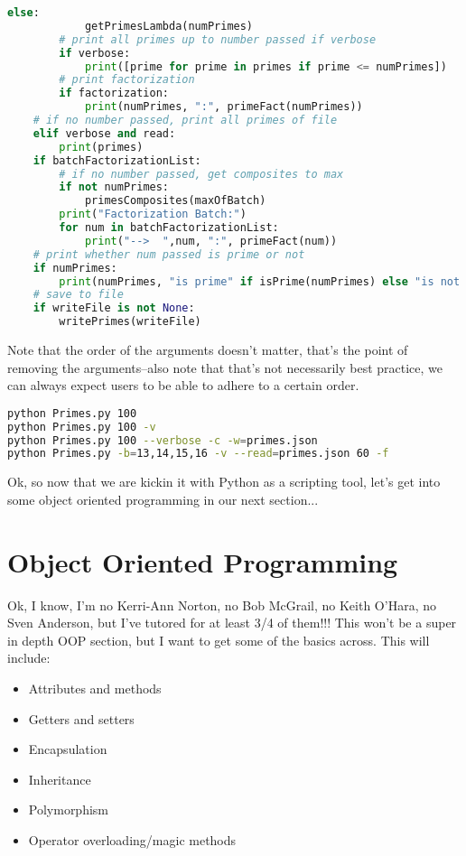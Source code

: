 \documentclass[12pt, twoside, reqno]{book}
\begin{document}
\begin{lstlisting}[language=Python]
        else:
            getPrimesLambda(numPrimes)
        # print all primes up to number passed if verbose
        if verbose:
            print([prime for prime in primes if prime <= numPrimes])
        # print factorization
        if factorization:
            print(numPrimes, ":", primeFact(numPrimes))
    # if no number passed, print all primes of file
    elif verbose and read:
        print(primes)
    if batchFactorizationList:
        # if no number passed, get composites to max
        if not numPrimes:
            primesComposites(maxOfBatch)
        print("Factorization Batch:")
        for num in batchFactorizationList:
            print("-->  ",num, ":", primeFact(num))
    # print whether num passed is prime or not
    if numPrimes:
        print(numPrimes, "is prime" if isPrime(numPrimes) else "is not prime")
    # save to file
    if writeFile is not None:
        writePrimes(writeFile)
\end{lstlisting}

Note that the order of the arguments doesn't matter, that's the point of removing the arguments--also note that that's not necessarily best practice, we can always expect users to be able to adhere to a certain order.
\begin{lstlisting}[language=sh]
python Primes.py 100
python Primes.py 100 -v
python Primes.py 100 --verbose -c -w=primes.json
python Primes.py -b=13,14,15,16 -v --read=primes.json 60 -f
\end{lstlisting}

Ok, so now that we are kickin it with Python as a scripting tool, let's get into some object oriented programming in our next section...

\section{Object Oriented Programming}

Ok, I know, I'm no Kerri-Ann Norton, no Bob McGrail, no Keith O'Hara, no Sven Anderson, but I've tutored for at least 3/4 of them!!! This won't be a super in depth OOP section, but I want to get some of the basics across. This will include:

\begin{itemize}[itemsep=2px, parsep=0pt]
\item Attributes and methods
\item Getters and setters
\item Encapsulation
\item Inheritance
\item Polymorphism
\item Operator overloading/magic methods
\end{itemize}
\end{document}
